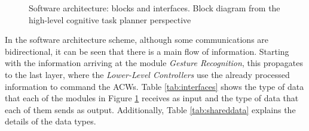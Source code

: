 \begin{figure}[ht]
{}
	\caption{Software architecture: blocks and interfaces. Block diagram from the high-level cognitive task planner perspective}
	\label{fig:NodeDiagram}
\end{figure}

In the software architecture scheme, although some communications are bidirectional, it can be seen that there is a main flow of information. Starting with the information arriving at the module \emph{Gesture Recognition}, this propagates to the last layer, where the \emph{Lower-Level Controllers} use the already processed information to command the \glspl{ACW}. Table \ref{tab:interfaces} shows the type of data that each of the modules in Figure \ref{fig:NodeDiagram} receives as input and the type of data that each of them sends as output. Additionally, Table \ref{tab:shareddata} explains the details of the data types. 

